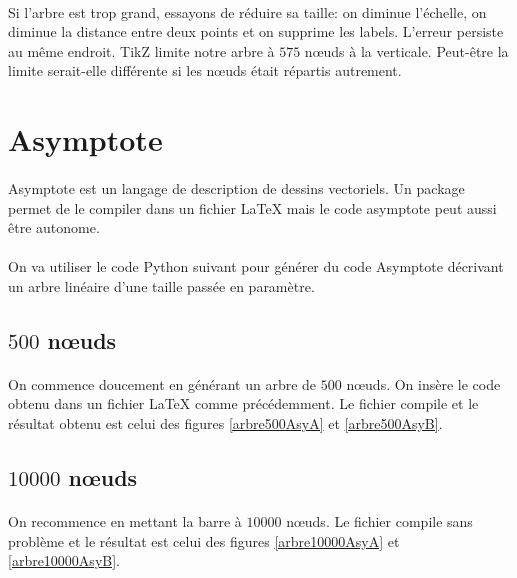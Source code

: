 \paragraph{} Si l'arbre est trop grand, essayons de réduire sa taille: on diminue l'échelle, on diminue la distance entre deux points et on supprime les labels. L'erreur persiste au même endroit. TikZ limite notre arbre à $575$ n\oe uds à la verticale. Peut-être la limite serait-elle différente si les n\oe uds était répartis autrement.

	\section{Asymptote}

\paragraph{}Asymptote est un langage de description de dessins vectoriels. Un package permet de le compiler dans un fichier \LaTeX{} mais le code asymptote peut aussi être autonome.

\paragraph{}On va utiliser le code Python suivant pour générer du code Asymptote décrivant un arbre linéaire d'une taille passée en paramètre.


		\subsection{$500$ n\oe uds}
		
\paragraph{}On commence doucement en générant un arbre de $500$ n\oe uds. On insère le code obtenu dans un fichier \LaTeX{} comme précédemment. Le fichier compile et le résultat obtenu est celui des figures \ref{arbre500AsyA} et \ref{arbre500AsyB}.

		\subsection{$10000$ n\oe uds}
\paragraph{}On recommence en mettant la barre à $10000$ n\oe uds. Le fichier compile sans problème et le résultat est celui des figures \ref{arbre10000AsyA} et \ref{arbre10000AsyB}.
	
